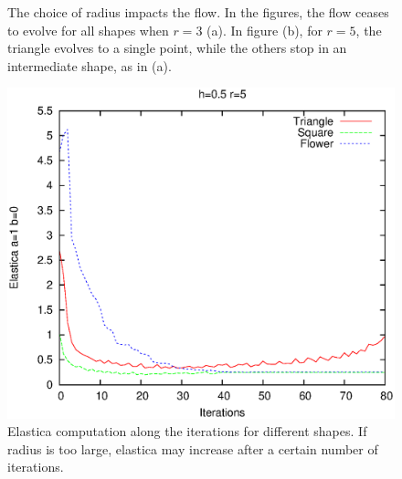 \documentclass[runningheads]{llncs}
\begin{document}
\begin{figure}[!ht]
{		\hspace{15pt}
		}				
\caption{The choice of radius impacts the flow. In the figures, the flow ceases to evolve for all shapes  when $r=3$ (a). In figure (b), for $r=5$, the triangle evolves to a single point, while the others stop  in an intermediate shape, as in (a). }
\label{fig:mx-flow-gs-radius-effect}
\end{figure}

\begin{figure}[!ht]
\center
\includegraphics[scale=0.5]{images/flow/elastica-energy-plot/r5h05.eps}
\caption{Elastica computation along the iterations for different shapes. If radius is too large, elastica may increase after a certain number of iterations. }
\label{fig:mx-elastica-plots}
\end{figure}
\end{document}
